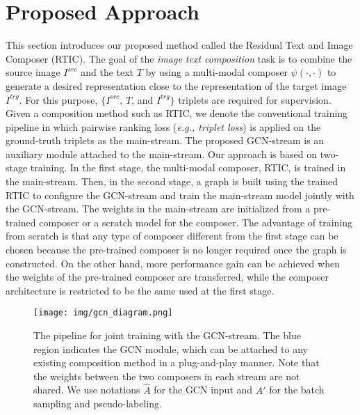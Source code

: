 \documentclass[10pt,twocolumn,letterpaper]{article}
\begin{document}
\section{Proposed Approach}
This section introduces our proposed method called the Residual Text and Image Composer (RTIC). The goal of the \textit{image text composition} task is to combine the source image $I^{src}$ and the text $T$ by using a multi-modal composer $\psi(\cdot, \cdot)$ to generate a desired representation close to the representation of the target image $I^{trg}$. For this purpose, $\{I^{src}$, $T$, and $I^{trg}\}$ triplets are required for supervision. Given a composition method such as RTIC, we denote the conventional training pipeline in which pairwise ranking loss (\textit{e.g., triplet loss}) is applied on the ground-truth triplets as the main-stream. The proposed GCN-stream is an auxiliary module attached to the main-stream. Our approach is based on two-stage training. In the first stage, the multi-modal composer, RTIC, is trained in the main-stream. Then, in the second stage, a graph is built using the trained RTIC to configure the GCN-stream and train the main-stream model jointly with the GCN-stream. The weights in the main-stream are initialized from a pre-trained composer or a scratch model for the composer. The advantage of training from scratch is that any type of composer different from the first stage can be chosen because the pre-trained composer is no longer required once the graph is constructed. On the other hand, more performance gain can be achieved when the weights of the pre-trained composer are transferred, while the composer architecture is restricted to be the same used at the first stage.

\begin{figure*}[t]
    \begin{center}
	    \texttt{[image: img/gcn\_diagram.png]}
	\end{center}
	\caption{The pipeline for joint training with the GCN-stream. The blue region indicates the GCN module, which can be attached to any existing composition method in a plug-and-play manner. Note that the weights between the two composers in each stream are not shared. We use notations $\hat{A}$ for the GCN input and $A'$ for the batch sampling and pseudo-labeling.}
	\label{fig:main_diagram}
\end{figure*}
\end{document}
